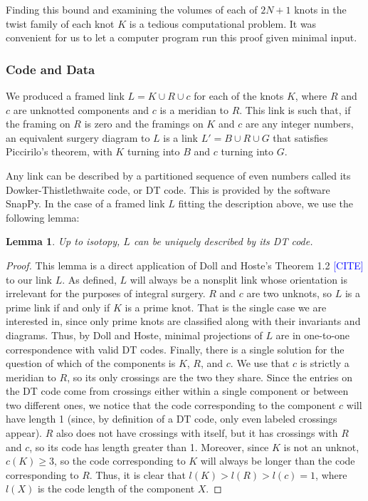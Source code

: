 \documentclass[11pt,usenames,dvipsnames,reqno]{amsart}
\numberwithin{theorem}{section}
\newtheorem{lemma}[theorem]{Lemma}
\theoremstyle{ex}
\theoremstyle{rem}
\def\kh#1{\textcolor{Blue}{#1}}
\begin{document}
Finding this bound and examining the volumes of each of $2 N + 1$ knots in the twist family of each knot $K$ is a tedious computational problem. It was convenient for us to let a computer program run this proof given minimal input.

\subsubsection{Code and Data}\label{sec:code}
We produced a framed link $L = K \cup R \cup c$ for each of the knots $K$, where $R$ and $c$ are unknotted components and $c$ is a meridian to $R$. This link is such that, if the framing on $R$ is zero and the framings on $K$ and $c$ are any integer numbers, an equivalent surgery diagram to $L$ is a link $L' = B \cup R \cup G$ that satisfies Piccirilo's theorem, with $K$ turning into $B$ and $c$ turning into $G$.

Any link can be described by a partitioned sequence of even numbers called its Dowker-Thistlethwaite  code, or DT code. This is provided by the software SnapPy. In the case of a framed link $L$ fitting the description above, we use the following lemma:

\begin{lemma}
	Up to isotopy, $L$ can be uniquely described by its DT code.
\end{lemma}
\begin{proof}
	This lemma is a direct application of Doll and Hoste's Theorem 1.2 \kh{[CITE]} to our link $L$. As defined, $L$ will always be a nonsplit link whose orientation is irrelevant for the purposes of integral surgery. $R$ and $c$ are two unknots, so $L$ is a prime link if and only if $K$ is a prime knot. That is the single case we are interested in, since only prime knots are classified along with their invariants and diagrams. Thus, by Doll and Hoste, minimal projections of $L$ are in one-to-one correspondence with valid DT codes.
	Finally, there is a single solution for the question of which of the components is $K$, $R$, and $c$. We use that $c$ is strictly a meridian to $R$, so its only crossings are the two they share. Since the entries on the DT code come from crossings either within a single component or between two different ones, we notice that the code corresponding to the component $c$ will have length 1 (since, by definition of a DT code, only even labeled crossings appear). $R$ also does not have crossings with itself, but it has crossings with $R$ and $c$, so its code has length greater than 1. Moreover, since $K$ is not an unknot, $c(K) \geq 3$, so the code corresponding to $K$ will always be longer than the code corresponding to $R$. Thus, it is clear that $l(K) > l(R) > l(c) = 1$, where $l(X)$ is the code length of the component $X$.
\end{proof}
\end{document}
